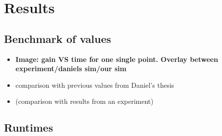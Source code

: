 \section{Results}


\subsection{Benchmark of values}

\begin{itemize}

  \item \textbf{Image: gain VS time for one single point. Overlay between
    experiment/daniels sim/our sim}

  \item comparison with previous values from Daniel's thesis

  \item (comparison with results from an experiment)

\end{itemize}



\subsection{Runtimes}

